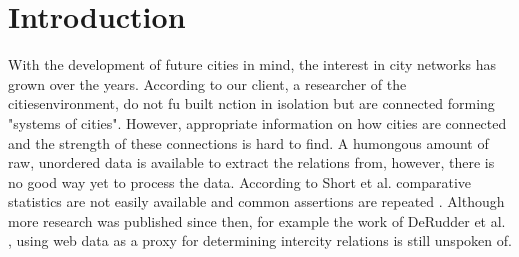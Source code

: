 \chapter{Introduction}
With the development of future cities in mind, the interest in city networks has grown over the years. According to our client, a researcher of the citiesenvironment, do not fu built nction in isolation but are connected forming "systems of cities". However, appropriate information on how cities are connected and the strength of these connections is hard to find. A humongous amount of raw, unordered data is available to extract the relations from, however, there is no good way yet to process the data. According to Short et al. comparative statistics are not easily available and common assertions are repeated \cite{short1996dirty}. Although more research was published since then, for example the work of DeRudder et al. \cite{derudder2005appraisal}, using web data as a proxy for determining intercity relations is still unspoken of. \\

